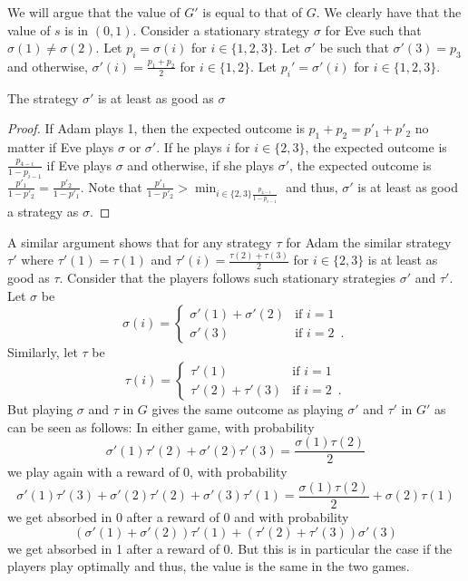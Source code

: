 We will argue that the value of $G'$ is equal to that of $G$.
 We clearly have that the value of $s$ is in $(0,1)$.
Consider a stationary strategy $\sigma$ for Eve
such that $\sigma(1)\neq \sigma(2)$. Let $p_i=\sigma(i)$ for $i\in \{1,2,3\}$. 
Let $\sigma'$ be such that $\sigma'(3)=p_3$ and otherwise, $\sigma'(i)=\frac{p_1+p_2}{2}$ for $i\in\{1,2\}$. Let $p_i'=\sigma'(i)$ for $i\in \{1,2,3\}$.
\begin{claim}
The strategy $\sigma'$ is at least as good as $\sigma$
\end{claim}
\begin{proof}
If Adam plays 1, then the expected outcome is 
$p_1+p_2=p'_1+p'_2$ no matter if Eve plays $\sigma$ or $\sigma'$. 
If he plays $i$ for $i\in\{2,3\}$, the expected outcome is $
\frac{p_{4-i}}{1-p_{i-1}}$ if Eve plays $\sigma$ and otherwise, if she plays $\sigma'$, the expected outcome is   
$\frac{p'_1}{1-p'_2}=\frac{p'_2}{1-p'_1}$. 
Note that $\frac{p'_1}{1-p'_2}>\min_{i\in\{2,3\}\frac{p_{4-i}}{1-p_{i-1}}}$ and thus, $\sigma'$ is at least as good a strategy as $\sigma$.
\end{proof}

A similar argument shows that for any strategy $\tau$ for Adam the similar strategy $\tau'$ where $\tau'(1)=\tau(1)$ and $\tau'(i)=\frac{\tau(2)+\tau(3)}{2}$ for $i\in\{2,3\}$ is at least as good as $\tau$.
Consider that the players follows such stationary strategies $\sigma'$ and $\tau'$.
Let $\sigma$ be 
\[\sigma(i)=\begin{cases} \sigma'(1)+\sigma'(2)&\text{if }i=1\\
\sigma'(3)&\text{if }i=2\enspace .\end{cases}\]
Similarly, let 
 $\tau$ be 
\[\tau(i)=\begin{cases} \tau'(1)&\text{if }i=1\\
\tau'(2)+\tau'(3)&\text{if }i=2\enspace .\end{cases}\]
But playing $\sigma$ and $\tau$ in $G$ gives the same outcome as playing $\sigma'$ and $\tau'$ in $G'$ as can be seen as follows: In either game, with probability
\[
\sigma'(1)\tau'(2)+\sigma'(2)\tau'(3)=\frac{\sigma(1)\tau(2)}{2}\] we play again with a reward of 0, with probability 
\[\sigma'(1)\tau'(3)+\sigma'(2)\tau'(2)+\sigma'(3)\tau'(1)=
\frac{\sigma(1)\tau(2)}{2}
+\sigma(2)\tau(1)
\]
we get absorbed in 0 after a reward of 0 and with probability \[
(\sigma'(1)+\sigma'(2))\tau'(1)+(\tau'(2)+\tau'(3))\sigma'(3)
\] we get absorbed in 1 after a reward of 0.
But this is in particular the case if the players play optimally and thus, the value is the same in the two games.



